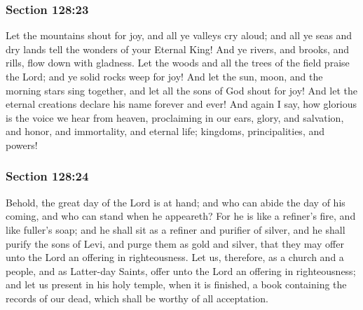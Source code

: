 	\subsubsection{Section 128:23} %
		\label{DC128-23}

		Let the mountains shout for joy, and all ye valleys cry aloud; and all ye seas and dry lands tell the wonders of your Eternal King! And ye rivers, and brooks, and rills, flow down with gladness. Let the woods and all the trees of the field praise the Lord; and ye solid rocks weep for joy! And let the sun, moon, and the morning stars sing together, and let all the sons of God shout for joy! And let the eternal creations declare his name forever and ever! And again I say, how glorious is the voice we hear from heaven, proclaiming in our ears, glory, and salvation, and honor, and immortality, and eternal life; kingdoms, principalities, and powers!


	\subsubsection{Section 128:24} %
		\label{DC128-24}

		Behold, the great day of the Lord is at hand; and who can abide the day of his coming, and who can stand when he appeareth? For he is like a refiner's fire, and like fuller's soap; and he shall sit as a refiner and purifier of silver, and he shall purify the sons of Levi, and purge them as gold and silver, that they may offer unto the Lord an offering in righteousness. Let us, therefore, as a church and a people, and as Latter-day Saints, offer unto the Lord an offering in righteousness; and let us present in his holy temple, when it is finished, a book containing the records of our dead, which shall be worthy of all acceptation.



